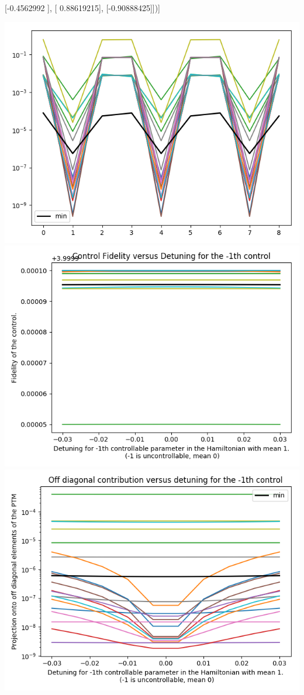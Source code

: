 \documentclass{article}
\begin{document}
       [-0.4562992 ],
       [ 0.88619215],
       [-0.90888425]])]
\begin{center}
\includegraphics[scale=.9]{report_pickled_controls7/control_dpn_all}
\includegraphics[scale=.9]{control_fid_0}
\includegraphics[scale=.9]{off_diag_0}

\end{center}
\end{document}
